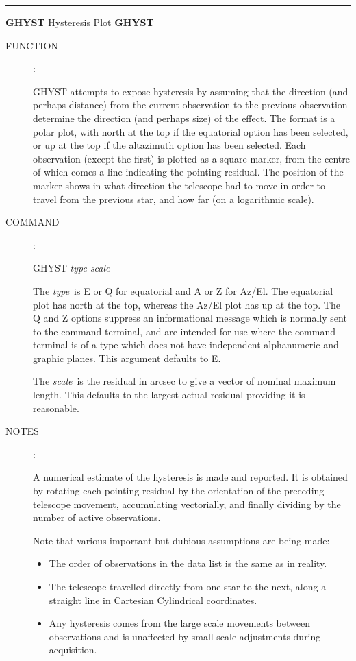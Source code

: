 \goodbreak
\rule{\textwidth}{0.3mm}
{\Large {\bf GHYST} \hfill Hysteresis Plot \hfill {\bf GHYST}}
\begin{description}
\item [FUNCTION]:

GHYST attempts to expose hysteresis by assuming that the
direction (and perhaps distance) from the current observation
to the previous observation determine the direction (and perhaps
size) of the effect.  The format is a polar plot, with north
at the top if the equatorial option has been selected, or up at
the top if the altazimuth option has been selected.  Each observation
(except the first) is plotted as a square marker, from the centre of
which comes a line indicating the pointing residual.  The position
of the marker shows in what direction the telescope had to move in
order to travel from the previous star, and how far (on a
logarithmic scale).

\item [COMMAND]:

\begin{cmd}
\> \> GHYST {\it type scale}
\end{cmd}

The {\it type}\, is E or Q for equatorial and A or Z
for Az/El.  The equatorial
plot has north at the top, whereas the Az/El plot has up
at the top.  The Q and Z options
suppress an informational message which is normally sent to
the command terminal, and are intended for use where the
command terminal is of a type which does not have independent
alphanumeric and graphic planes.  This argument defaults to E.

The {\it scale}\, is the residual in arcsec to
give a vector of nominal maximum length.  This defaults
to the largest actual residual providing it is reasonable.

\item [NOTES]:

A numerical estimate of the hysteresis is made and reported.  It
is obtained by rotating each pointing residual by the orientation
of the preceding telescope movement, accumulating vectorially,
and finally dividing by the number of active observations.

Note that various important but dubious assumptions are being made:
\begin{itemize}
\item The order of observations in the data list is the same
as in reality.
\item The telescope travelled directly from one star to the
next, along a straight line in Cartesian Cylindrical coordinates.
\item Any hysteresis comes from the large scale movements
between observations and is unaffected by small scale
adjustments during acquisition.
\end{itemize}


\end{description}
